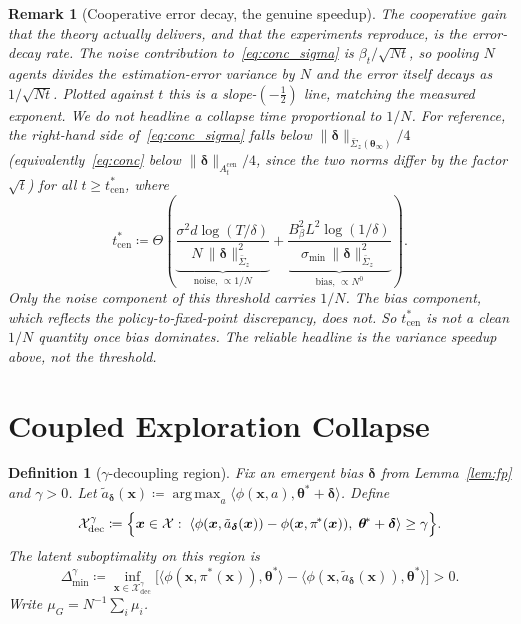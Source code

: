 \documentclass[11pt]{article}
\newtheorem{definition}[theorem]{Definition}
\newtheorem*{remark}{Remark}
\DeclareMathOperator*{\argmax}{arg\,max}
\begin{document}
\begin{remark}[Cooperative error decay, the genuine speedup]\label{rem:tstar}
The cooperative gain that the theory actually delivers, and that the
experiments reproduce, is the \emph{error-decay rate}. The noise
contribution to~\eqref{eq:conc_sigma} is $\beta_t/\sqrt{Nt}$, so pooling
$N$ agents divides the estimation-error variance by $N$ and the error
itself decays as $1/\sqrt{Nt}$.  Plotted against $t$ this is a
slope-$(-\tfrac12)$ line, matching the measured exponent.  We do
\emph{not} headline a collapse time proportional to $1/N$.  For
reference, the right-hand side of~\eqref{eq:conc_sigma} falls below
$\|\bm{\delta}\|_{\bar{\Sigma}_z(\bm{\theta}_\infty)}/4$
(equivalently~\eqref{eq:conc} below
$\|\bm{\delta}\|_{A_t^{\mathrm{cen}}}/4$, since the two norms differ by
the factor $\sqrt t$) for all $t\geq t_{\mathrm{cen}}^*$, where
\begin{equation}
t_{\mathrm{cen}}^*\coloneqq\Theta\!\left(
\underbrace{\frac{\sigma^2 d\log(T/\delta)}{N\,\|\bm{\delta}\|_{\bar{\Sigma}_z}^2}}_{\text{noise, }\propto 1/N}
+\underbrace{\frac{B_\beta^2 L^2\log(1/\delta)}{\sigma_{\min}\,\|\bm{\delta}\|_{\bar{\Sigma}_z}^2}}_{\text{bias, }\propto N^0}
\right).
\label{eq:tcen_def}
\end{equation}
Only the noise component of this threshold carries $1/N$. The bias
component, which reflects the policy-to-fixed-point discrepancy, does
not.  So $t_{\mathrm{cen}}^*$ is \emph{not} a clean $1/N$ quantity once
bias dominates.  The reliable headline is the variance speedup above,
not the threshold.
\end{remark}


\section{Coupled Exploration Collapse}\label{sec:cec}

\begin{definition}[$\gamma$-decoupling region]\label{def:dec}
Fix an emergent bias $\bm{\delta}$ from Lemma~\ref{lem:fp}
and $\gamma>0$.
Let $\tilde{a}_{\bm{\delta}}(\bm{x})\coloneqq
\argmax_a\langle\phi(\bm{x},a),\bm{\theta}^{\!*}+\bm{\delta}\rangle$.
Define
\[
\mathcal{X}_{\mathrm{dec}}^\gamma\coloneqq\Bigl\{\bm{x}\in\mathcal{X}:\;
\langle\phi(\bm{x},\tilde{a}_{\bm{\delta}}(\bm{x}))
-\phi(\bm{x},\pi^{\!*}(\bm{x})),\;\bm{\theta}^{\!*}+\bm{\delta}\rangle\geq\gamma
\Bigr\}.
\]
The \emph{latent suboptimality} on this region is
\[
\Delta_{\min}^\gamma\coloneqq
\inf_{\bm{x}\in\mathcal{X}_{\mathrm{dec}}^\gamma}
\bigl[\langle\phi(\bm{x},\pi^{\!*}(\bm{x})),\bm{\theta}^{\!*}\rangle
-\langle\phi(\bm{x},\tilde{a}_{\bm{\delta}}(\bm{x})),\bm{\theta}^{\!*}\rangle\bigr]>0.
\]
Write $\mu_G=N^{-1}\sum_i\mu_i$.
\end{definition}
\end{document}
